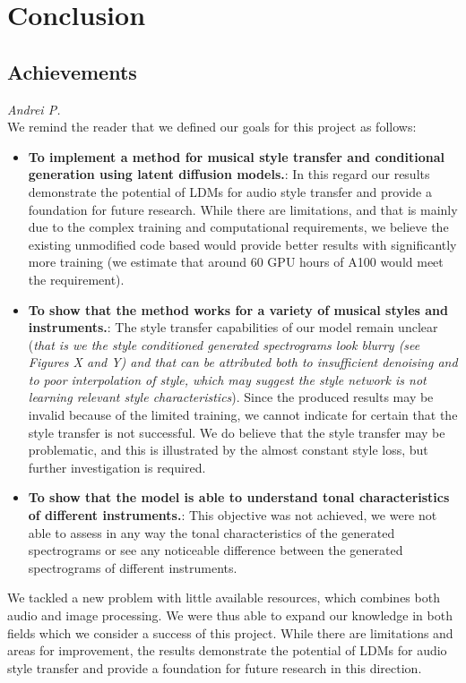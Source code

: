 \section{Conclusion}

\subsection{Achievements}
\textit{Andrei P.}\\
We remind the reader that we defined our goals for this project as follows:
\begin{itemize}
    \item \textbf{To implement a method for musical style transfer and conditional generation using latent diffusion models.}: In this regard our results demonstrate the potential of LDMs for audio style transfer and provide a foundation for future research. While there are limitations, and that is mainly due to the complex training and computational requirements, we believe the existing unmodified code based would provide better results with significantly more training (we estimate that around 60 GPU hours of A100 would meet the requirement).
    \item \textbf{To show that the method works for a variety of musical styles and instruments.}: The style transfer capabilities of our model remain unclear (\textit{that is we the style conditioned generated spectrograms look blurry (see Figures X and Y) and that can be attributed both to insufficient denoising and to poor interpolation of style, which may suggest the style network is not learning relevant style characteristics}). Since the produced results may be invalid because of the limited training, we cannot indicate for certain that the style transfer is not successful. We do believe that the style transfer may be problematic, and this is illustrated by the almost constant style loss, but further investigation is required.
    \item \textbf{To show that the model is able to understand tonal characteristics of different instruments.}: This objective was not achieved, we were not able to assess in any way the tonal characteristics of the generated spectrograms or see any noticeable difference between the generated spectrograms of different instruments.
\end{itemize}

\vspace{0.5cm}


\noindent We tackled a new problem with little available resources, which combines both audio and image processing. We were thus able to expand our knowledge in both fields which we consider a success of this project. While there are limitations and areas for improvement, the results demonstrate the potential of LDMs for audio style transfer and provide a foundation for future research in this direction. 

